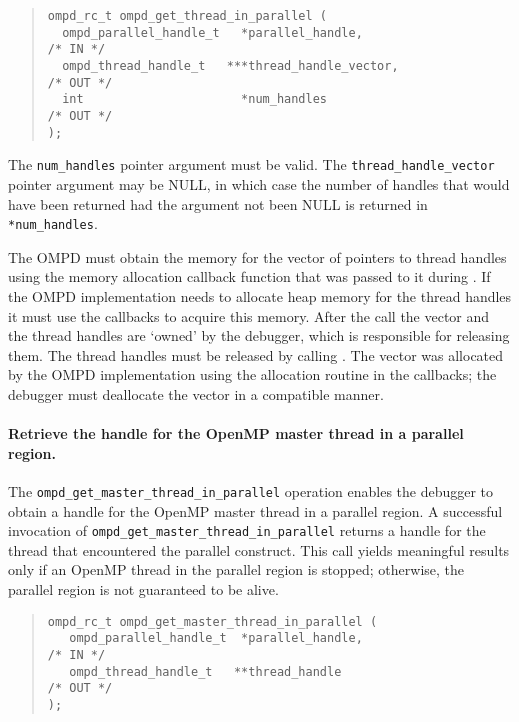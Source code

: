\begin{quote}
\begin{lstlisting}
ompd_rc_t ompd_get_thread_in_parallel (
  ompd_parallel_handle_t   *parallel_handle,                        /* IN */
  ompd_thread_handle_t   ***thread_handle_vector,                  /* OUT */
  int                      *num_handles                            /* OUT */
);
\end{lstlisting}
\end{quote}
The \texttt{num\_handles} pointer argument must be valid.
The \texttt{thread\_handle\_vector} pointer argument may be NULL, in which
case the number of handles that would have been returned had the argument
not been NULL is returned in \texttt{*num\_handles}.

The OMPD must obtain the memory for the vector of pointers to thread handles
using the memory allocation callback function that was passed to it
during .
If the OMPD implementation needs to allocate heap memory for the
thread handles it must use the callbacks to acquire this memory.
After the call the vector and the thread handles are `owned' by the debugger,
which is responsible for releasing them.
The thread handles must be released by calling
.
The vector was allocated by the OMPD implementation using the allocation
routine in the callbacks; the debugger must deallocate  the vector
in a compatible manner.

\paragraph{Retrieve the handle for the OpenMP master thread in a parallel 
region.}
The  \verb|ompd_get_master_thread_in_parallel| operation
enables the debugger to obtain 
a handle for the OpenMP master thread in a parallel region. 
A successful invocation of \verb|ompd_get_master_thread_in_parallel|
returns a handle
for the thread that encountered the parallel construct. This call yields
meaningful results only if an OpenMP thread in the parallel region is
stopped; otherwise, the parallel region is not guaranteed to be alive. 
\begin{quote}
\begin{lstlisting}
ompd_rc_t ompd_get_master_thread_in_parallel (
   ompd_parallel_handle_t  *parallel_handle,                        /* IN */
   ompd_thread_handle_t   **thread_handle                          /* OUT */
); 
\end{lstlisting}
\end{quote}

